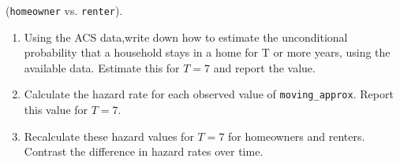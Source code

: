 \documentclass[11pt, a4paper]{article}
\begin{document}
\begin{enumerate}
  (\texttt{homeowner} vs. \texttt{renter}).
    \begin{enumerate}
    \item Using the ACS data,write down how to estimate the unconditional probability that a household stays in a home for T or more years, using the available data. Estimate this for $T=7$ and report the value.
    \item Calculate the hazard rate for each observed value of
      \texttt{moving\_approx}. Report this value for $T=7$.
    \item Recalculate these hazard values for $T=7$ for homeowners and
      renters. Contrast the difference in hazard rates over time.
    \end{enumerate}
   
\end{enumerate}
\end{document}
